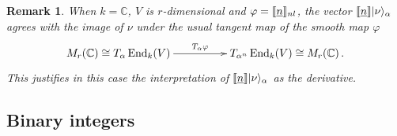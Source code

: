 \documentclass[english,letter paper,12pt,reqno]{article}
\DeclarePairedDelimiter\ket{\lvert}{\rangle}
\theoremstyle{example}
\newtheorem{remark}[theorem]{Remark}
\DeclareMathOperator{\End}{End}
\begin{document}
\begin{remark} When $k = \mathbb{C}$, $V$ is $r$-dimensional and $\varphi = \llbracket \underline{n} \rrbracket_{nl}$, the vector $\den{\underline{n}}\ket{\nu}_\alpha$ agrees with the image of $\nu$ under the usual tangent map of the smooth map $\varphi$
\[
\xymatrix@C+2pc{
M_r(\mathbb{C}) \cong T_\alpha \End_k(V) \ar[r]^-{T_\alpha \varphi} & T_{\alpha^n}\End_k(V) \cong M_r(\mathbb{C})\,.
}
\]
This justifies in this case the interpretation of $\den{\underline{n}}\ket{\nu}_\alpha$ as the derivative.
\end{remark}


\subsection{Binary integers}\label{section:bint}
\end{document}
